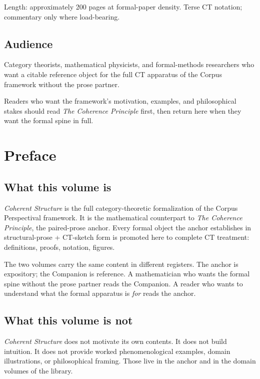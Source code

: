 \documentclass[11pt, openany]{book}
\newcommand{\sectionbreak}{\clearpage}
\begin{document}
Length: approximately 200 pages at formal-paper density. Terse CT notation; commentary only where load-bearing.

\sectionbreak

\section{Audience}

Category theorists, mathematical physicists, and formal-methods researchers who want a citable reference object for the full CT apparatus of the Corpus framework without the prose partner.

Readers who want the framework's motivation, examples, and philosophical stakes should read \textit{The Coherence Principle} first, then return here when they want the formal spine in full.

\chapter{Preface}


\section{What this volume is}

\textit{Coherent Structure} is the full category-theoretic formalization of the Corpus Perspectival framework. It is the mathematical counterpart to \textit{The Coherence Principle}, the paired-prose anchor. Every formal object the anchor establishes in structural-prose + CT-sketch form is promoted here to complete CT treatment: definitions, proofs, notation, figures.

The two volumes carry the same content in different registers. The anchor is expository; the Companion is reference. A mathematician who wants the formal spine without the prose partner reads the Companion. A reader who wants to understand what the formal apparatus is \textit{for} reads the anchor.

\section{What this volume is not}

\textit{Coherent Structure} does not motivate its own contents. It does not build intuition. It does not provide worked phenomenological examples, domain illustrations, or philosophical framing. Those live in the anchor and in the domain volumes of the library.
\end{document}
